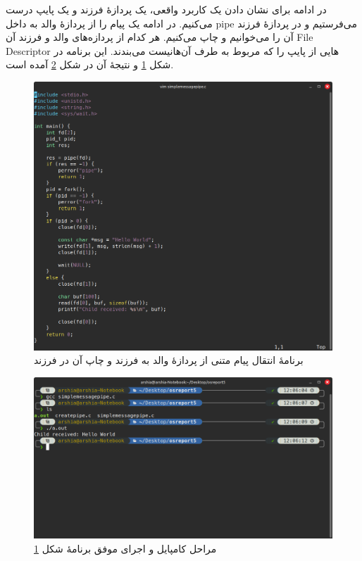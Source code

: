 \documentclass[12pt]{article}
\begin{document}
	در ادامه برای نشان دادن یک کاربرد واقعی، یک پردازهٔ فرزند و یک پایپ درست می‌کنیم. در ادامه یک پیام را از پردازهٔ والد به داخل pipe می‌فرستیم و در پردازهٔ فرزند آن را می‌خوانیم و چاپ می‌کنیم. هر کدام از پردازه‌های والد و فرزند آن \textenglish{File Descriptor} هایی از پایپ را که مربوط به طرف آن‌‌هانیست می‌بندند. این برنامه در شکل \ref{img:4} و نتیجهٔ آن در شکل \ref{img:5} آمده است.
	\begin{figure}[H]
		\centering
		\includegraphics[width=\textwidth]{report5-resources/4.png}
		\caption{برنامهٔ انتقال پیام متنی از پردازهٔ والد به فرزند و چاپ آن در فرزند}
		\label{img:4}
	\end{figure}
	\begin{figure}[H]
		\centering
		\includegraphics[width=\textwidth]{report5-resources/5.png}
		\caption{مراحل کامپایل و اجرای موفق برنامهٔ شکل \ref{img:4}}
		\label{img:5}
	\end{figure}
\end{document}
